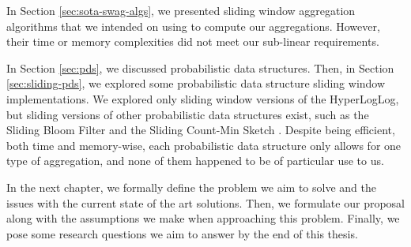 In Section \ref{sec:sota-swag-algs}, we presented sliding window aggregation algorithms that we intended on using to compute our aggregations. However, their time or memory complexities did not meet our sub-linear requirements.

In Section \ref{sec:pds}, we discussed probabilistic data structures. Then, in Section \ref{sec:sliding-pds}, we explored some probabilistic data structure sliding window implementations. We explored only sliding window versions of the HyperLogLog, but sliding versions of other probabilistic data structures exist, such as the Sliding Bloom Filter \cite{SlidingBloom} and the Sliding Count-Min Sketch \cite{SlidingCMS}. Despite being efficient, both time and memory-wise, each probabilistic data structure only allows for one type of aggregation, and none of them happened to be of particular use to us.

In the next chapter, we formally define the problem we aim to solve and the issues with the current state of the art solutions. Then, we formulate our proposal along with the assumptions we make when approaching this problem. Finally, we pose some research questions we aim to answer by the end of this thesis.
